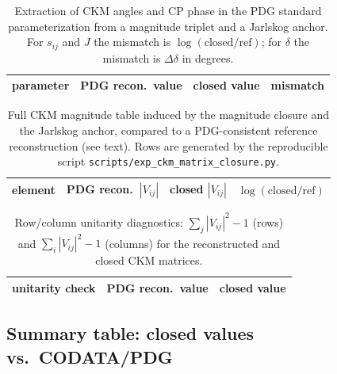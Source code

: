 \begin{table}[t]
\centering
\small
\setlength{\tabcolsep}{6pt}
\renewcommand{\arraystretch}{1.15}
\begin{tabular}{lrrr}
\toprule
parameter & PDG recon.\ value & closed value & mismatch \\
\midrule
%
\end{tabular}
\caption{Extraction of CKM angles and CP phase in the PDG standard parameterization from a magnitude triplet and a Jarlskog anchor. For $s_{ij}$ and $J$ the mismatch is $\log(\mathrm{closed}/\mathrm{ref})$; for $\delta$ the mismatch is $\Delta\delta$ in degrees.}
\label{tab:ckm_angles}
\end{table}

\begin{table}[t]
\centering
\small
\setlength{\tabcolsep}{6pt}
\renewcommand{\arraystretch}{1.15}
\begin{tabular}{lrrr}
\toprule
element & PDG recon.\ $|V_{ij}|$ & closed $|V_{ij}|$ & $\log(\mathrm{closed}/\mathrm{ref})$ \\
\midrule
%
\end{tabular}
\caption{Full CKM magnitude table induced by the magnitude closure and the Jarlskog anchor, compared to a PDG-consistent reference reconstruction (see text). Rows are generated by the reproducible script \texttt{scripts/exp\_ckm\_matrix\_closure.py}.}
\label{tab:ckm_matrix_closure}
\end{table}

\begin{table}[t]
\centering
\small
\setlength{\tabcolsep}{10pt}
\renewcommand{\arraystretch}{1.15}
\begin{tabular}{lrr}
\toprule
unitarity check & PDG recon.\ value & closed value \\
\midrule
%
\end{tabular}
\caption{Row/column unitarity diagnostics: $\sum_j |V_{ij}|^2-1$ (rows) and $\sum_i |V_{ij}|^2-1$ (columns) for the reconstructed and closed CKM matrices.}
\label{tab:ckm_unitarity}
\end{table}

\subsection{Summary table: closed values vs.\ CODATA/PDG}
\label{subsec:summary_table}

